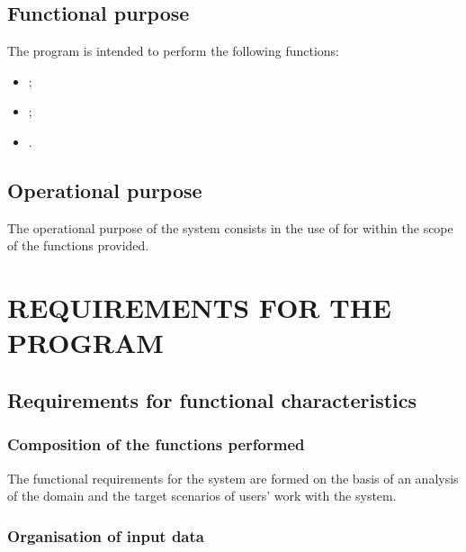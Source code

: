 \documentclass[12pt,a4paper]{extarticle}
\begin{document}
\subsection{Functional purpose}

The program is intended to perform the following functions:
\begin{itemize}[nosep, leftmargin=1.25cm]
    \item {};
    \item {};
    \item {}.
\end{itemize}

\subsection{Operational purpose}

The operational purpose of the system consists in the use of  for  within the scope of the functions provided.

\clearpage

\section{REQUIREMENTS FOR THE PROGRAM}

\subsection{Requirements for functional characteristics}
\label{sec:functional_reqs}

\subsubsection{Composition of the functions performed}



\clearpage

The functional requirements for the system are formed on the basis of an analysis of the domain and the target scenarios of users' work with the system.

\subsubsection{Organisation of input data}
\label{sec:input_data}
\end{document}
